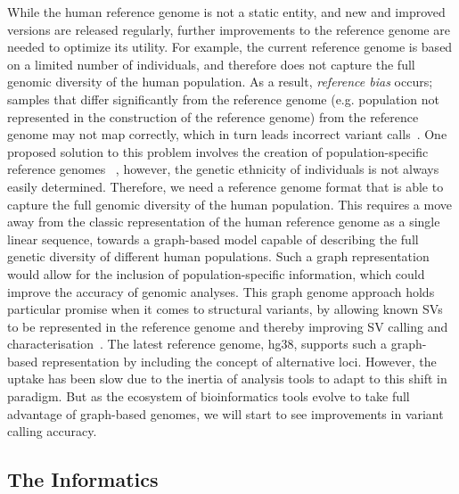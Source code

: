 While the human reference genome is not a static entity, and new and improved versions are released regularly, further improvements to the reference genome are needed to optimize its utility.
For example, the current reference genome is based on a limited number of individuals, and therefore does not capture the full genomic diversity of the human population.
As a result, \emph{reference bias} occurs; samples that differ significantly from the reference genome (e.g. population not represented in the construction of the reference genome) from the reference genome may not map correctly, which in turn leads incorrect variant calls~\cite{ballouz2019time}.
One proposed solution to this problem involves the creation of population-specific reference genomes ~\cite{cho2016ethnically}, however, the genetic ethnicity of individuals is not always easily determined.
Therefore, we need a reference genome format that is able to capture the full genomic diversity of the human population. This requires a move away from the classic representation of the human reference genome as a single linear sequence, towards a graph-based model capable of describing the full genetic diversity of different human populations.
Such a graph representation would allow for the inclusion of population-specific information, which could improve the accuracy of genomic analyses.
This graph genome approach holds particular promise when it comes to structural variants, by allowing known SVs to be represented in the reference genome and thereby improving SV calling and characterisation~\cite{rakocevic2019fast}.
The latest reference genome, hg38, supports such a graph-based representation by including the concept of alternative loci.
However, the uptake has been slow due to the inertia of analysis tools to adapt to this shift in paradigm. But as the ecosystem of bioinformatics tools evolve to take full advantage of graph-based genomes, we will start to see improvements in variant calling accuracy.

\subsection{The Informatics}
